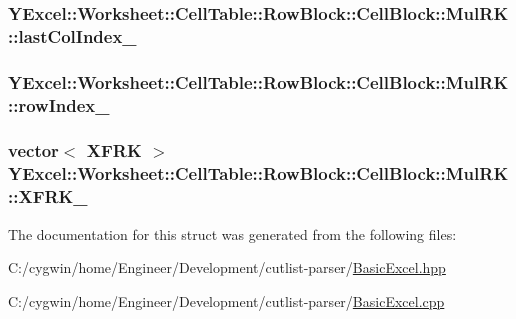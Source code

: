 \subsubsection[{last\+Col\+Index\+\_\+}]{ Y\+Excel\+::\+Worksheet\+::\+Cell\+Table\+::\+Row\+Block\+::\+Cell\+Block\+::\+Mul\+R\+K\+::last\+Col\+Index\+\_\+}\label{struct_y_excel_1_1_worksheet_1_1_cell_table_1_1_row_block_1_1_cell_block_1_1_mul_r_k_a1fb3bb89c4f678168a1b1573167349fb}
\hypertarget{struct_y_excel_1_1_worksheet_1_1_cell_table_1_1_row_block_1_1_cell_block_1_1_mul_r_k_a8fc8a116df0616158474410fa0578454}{}
\subsubsection[{row\+Index\+\_\+}]{ Y\+Excel\+::\+Worksheet\+::\+Cell\+Table\+::\+Row\+Block\+::\+Cell\+Block\+::\+Mul\+R\+K\+::row\+Index\+\_\+}\label{struct_y_excel_1_1_worksheet_1_1_cell_table_1_1_row_block_1_1_cell_block_1_1_mul_r_k_a8fc8a116df0616158474410fa0578454}
\hypertarget{struct_y_excel_1_1_worksheet_1_1_cell_table_1_1_row_block_1_1_cell_block_1_1_mul_r_k_a9a7ef9e097742841e10695db5910fac6}{}
\subsubsection[{X\+F\+R\+K\+\_\+}]{\setlength{\rightskip}{0pt plus 5cm}vector$<$ {\bf X\+F\+R\+K} $>$ Y\+Excel\+::\+Worksheet\+::\+Cell\+Table\+::\+Row\+Block\+::\+Cell\+Block\+::\+Mul\+R\+K\+::\+X\+F\+R\+K\+\_\+}\label{struct_y_excel_1_1_worksheet_1_1_cell_table_1_1_row_block_1_1_cell_block_1_1_mul_r_k_a9a7ef9e097742841e10695db5910fac6}


The documentation for this struct was generated from the following files\+:\begin{DoxyCompactItemize}
\item 
C\+:/cygwin/home/\+Engineer/\+Development/cutlist-\/parser/\hyperlink{_basic_excel_8hpp}{Basic\+Excel.\+hpp}\item 
C\+:/cygwin/home/\+Engineer/\+Development/cutlist-\/parser/\hyperlink{_basic_excel_8cpp}{Basic\+Excel.\+cpp}\end{DoxyCompactItemize}
